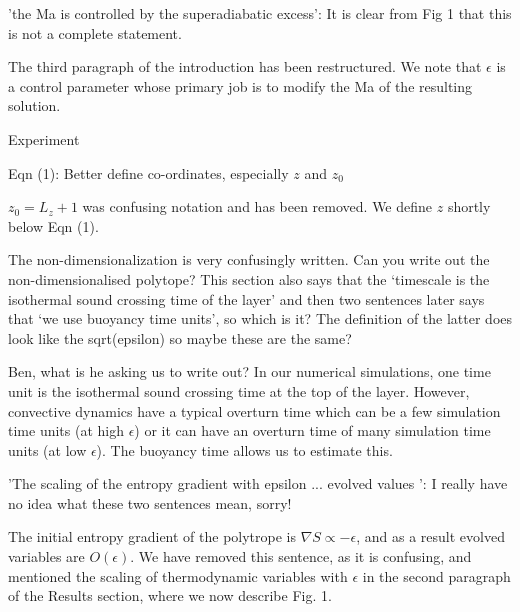 \documentclass[aps, 11pt, singlecolumn]{revtex4-1} %
\begin{document}
\begin{singlespace}
\begin{myquotation}
'the Ma is controlled by the superadiabatic excess': It is clear
from Fig 1 that this is not a complete statement.
\end{myquotation}
The third paragraph of the introduction has been restructured.  We note
that $\epsilon$ is a control parameter whose primary job is to modify
the Ma of the resulting solution.

\begin{myquotation}
Experiment

Eqn (1): Better define co-ordinates, especially $z$ and $z_0$
\end{myquotation}
$z_0 = L_z + 1$ was confusing notation and has been removed.  
We define $z$ shortly below Eqn (1).

\begin{myquotation}
The non-dimensionalization is very confusingly written. Can you write
out the non-dimensionalised polytope? This section also says that the
`timescale is the isothermal sound crossing time of the layer'
and then two sentences later says that `we use buoyancy time
units', so which is it? The definition of the latter does look like
the sqrt(epsilon) so maybe these are the same?
\end{myquotation}
Ben, what is he asking us to write out?
In our numerical simulations, one time unit is the isothermal sound
crossing time at the top of the layer.  However, convective dynamics
have a typical overturn time which can be a few simulation time units
(at high $\epsilon$) or it can have an overturn time of many simulation
time units (at low $\epsilon$).  The buoyancy time allows us to estimate this.

\begin{myquotation}
'The scaling of the entropy gradient with epsilon ... evolved
values ': I really have no idea what these two sentences mean,
sorry!
\end{myquotation}
The initial entropy gradient of the polytrope is $\nabla S \propto -\epsilon$,
and as a result evolved variables are $O(\epsilon)$.  We have removed this
sentence, as it is confusing, and mentioned the scaling of thermodynamic variables
with $\epsilon$ in the second paragraph of the Results section, where we now describe
Fig. 1.


\end{singlespace}
\end{document}
